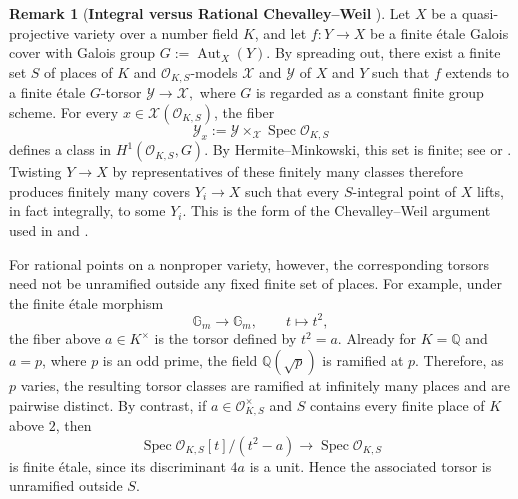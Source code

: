 \documentclass[12 pt]{amsart}
\theoremstyle{definition}
\newtheorem{Remark}[theorem]{Remark}
\begin{document}
\begin{Remark}[\textbf{Integral versus Rational Chevalley--Weil
}]\label{Chevalley--Weil}
Let \(X\) be a quasi-projective variety over a number field \(K\), and
let \(f\colon Y\to X\) be a finite \'etale Galois cover with Galois
group
\(
G:=\operatorname{Aut}_X(Y).
\)
By spreading out, there exist a finite set \(S\) of places of \(K\) and
\(\mathcal O_{K,S}\)-models \(\mathcal X\) and \(\mathcal Y\) of \(X\)
and \(Y\) such that \(f\) extends to a finite \'etale \(G\)-torsor
\(
\mathcal Y\to\mathcal X,
\)
where \(G\) is regarded as a constant finite group scheme. For every
\(x\in\mathcal X(\mathcal O_{K,S})\), the fiber
\[
\mathcal Y_x:=
\mathcal Y\times_{\mathcal X}\operatorname{Spec}\mathcal O_{K,S}
\]
defines a class in \(H^1(\mathcal O_{K,S},G)\). By
Hermite--Minkowski, this set is finite; see
\cite[Proposition~4.6]{brunebarbe2022counting} or
\cite[Proof of Claim~2]{ellenberg2023sparsity}. Twisting \(Y\to X\)
by representatives of these finitely many classes therefore produces
finitely many covers \(Y_i\to X\) such that every \(S\)-integral point
of \(X\) lifts, in fact integrally, to some \(Y_i\). This is the form
of the Chevalley--Weil argument used in
\cite[\S 3]{ellenberg2023sparsity} and
\cite[Proposition~4.12]{brunebarbe2022counting}.

For rational points on a nonproper variety, however, the corresponding
torsors need not be unramified outside any fixed finite set of places.
For example, under the finite \'etale morphism
\[
\mathbb G_m\longrightarrow\mathbb G_m,\qquad t\longmapsto t^2,
\]
the fiber above \(a\in K^\times\) is the torsor defined by \(t^2=a\).
Already for \(K=\mathbb Q\) and \(a=p\), where \(p\) is an odd prime,
the field \(\mathbb Q(\sqrt p)\) is ramified at \(p\). Therefore, as \(p\)
varies, the resulting torsor classes are ramified at infinitely many
places and are pairwise distinct. By contrast, if
\(a\in\mathcal O_{K,S}^{\times}\) and \(S\) contains every finite place
of \(K\) above \(2\), then
\[
\operatorname{Spec}\mathcal O_{K,S}[t]/(t^2-a)
\longrightarrow\operatorname{Spec}\mathcal O_{K,S}
\]
is finite \'etale, since its discriminant \(4a\) is a unit. Hence the
associated torsor is unramified outside \(S\).
\end{Remark}






\end{document}
